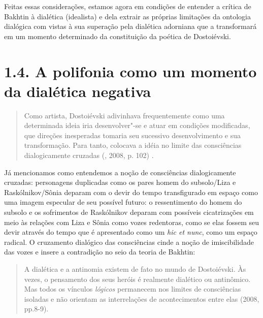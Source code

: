 Feitas essas considerações, estamos agora em condições de entender a
crítica de Bakhtin à dialética (idealista) e dela extrair as próprias
limitações da ontologia dialógica com vistas à sua superação pela
dialética adorniana que a transformará em um momento determinado da
constituição da poética de Dostoiévski.

\section{1.4. A polifonia como um momento da dialética negativa}

\begin{quote}
Como artista, Dostoiévski adivinhava frequentemente como uma determinada
ideia iria desenvolver"-se e atuar em condições modificadas, que direções
inesperadas tomaria seu sucessivo desenvolvimento e sua transformação.
Para tanto, colocava a idéia no limite das consciências dialogicamente
cruzadas (, 2008, p. 102)
.
\end{quote}

Já mencionamos como entendemos a noção de consciências dialogicamente
cruzadas: personagens duplicadas como os pares homem do subsolo/Liza e
Raskólnikov/Sônia deparam com o devir do tempo transfigurado em espaço
como uma imagem especular de seu possível futuro: o ressentimento do
homem do subsolo e os sofrimentos de Raskólnikov deparam com possíveis
cicatrizações em meio às relações com Liza e Sônia como vozes
redentoras, como se elas fossem seu devir através do tempo que é
apresentado como um \emph{hic et nunc}, como um espaço radical. O
cruzamento dialógico das consciências cinde a noção de imiscibilidade
das vozes e insere a contradição no seio da teoria de Bakhtin:

\begin{quote}
A dialética e a antinomia existem de fato no mundo de Dostoiévski. Às
vezes, o pensamento dos seus heróis é realmente dialético ou antinômico.
Mas todos os vínculos \emph{lógicos} permanecem nos limites de
consciências isoladas e não orientam as interrelações de acontecimentos
entre elas (2008, pp.8-9).
\end{quote}

